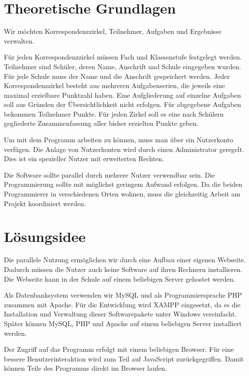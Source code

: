 \chapter{Theoretische Grundlagen}

Wir möchten Korrespondenzzirkel, Teilnehmer, Aufgaben und Ergebnisse verwalten.

Für jeden Korrespondenzzirkel müssen Fach und Klassenstufe festgelegt werden. 
Teilnehmer sind Schüler, deren Name, Anschrift und Schule eingegeben wurden. Für jede Schule muss der Name und die Anschrift gespeichert werden. 
Jeder Korrespondenzzirkel besteht aus mehreren Aufgabenserien, die jeweils eine maximal erzielbare Punktzahl haben. Eine Aufgliederung auf einzelne Aufgaben soll aus Gründen der Übersichtlichkeit nicht erfolgen.
Für abgegebene Aufgaben bekommen Teilnehmer Punkte. Für jeden Zirkel soll es eine nach Schülern gegliederte Zusammenfassung aller bisher erzielten Punkte geben.

Um mit dem Programm arbeiten zu können, muss man über ein Nutzerkonto verfügen. Die Anlage von Nutzerkonten wird durch einen Administrator geregelt. Dies ist ein spezieller Nutzer mit erweiterten Rechten.

Die Software sollte parallel durch mehrere Nutzer verwendbar sein.
Die Programmierung sollte mit möglichst geringem Aufwand erfolgen.
Da die beiden Programmierer in verschiedenen Orten wohnen, muss die gleichzeitig Arbeit am Projekt koordiniert werden.

\chapter{Lösungsidee}

Die parallele Nutzung ermöglichen wir durch eine Aufbau einer eigenen Webseite. Dadurch müssen die Nutzer auch keine Software auf ihren Rechnern installieren. Die Webseite kann in der Schule auf einem beliebigen Server gehostet werden. 

Als Datenbanksystem verwenden wir MySQL und als Programmiersprache PHP zusammen mit Apache. Für die Entwicklung wird XAMPP eingesetzt, da es die Installation und Verwaltung dieser Softwarepakete unter Windows vereinfacht. Später können MySQL, PHP und Apache auf einem beliebigen Server installiert werden.

Der Zugriff auf das Programm erfolgt mit einem beliebigen Browser. Für eine bessere Benutzerinteraktion wird zum Teil auf JavaScript zurückgegriffen. Damit können Teile des Programms direkt im Browser laufen.

